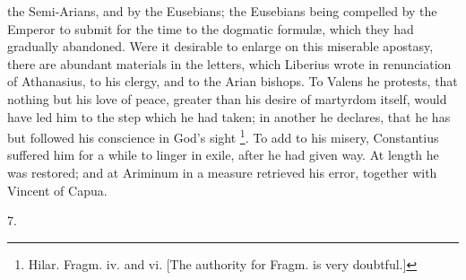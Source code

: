 the Semi-Arians, and by the Eusebians; the Eusebians being compelled
by the Emperor to submit for the time to the dogmatic formulæ, which
they had gradually abandoned. Were it desirable to enlarge on this
miserable apostasy, there are abundant materials in the letters, which
Liberius wrote in renunciation of Athanasius, to his clergy, and to
the Arian bishops. To Valens he protests, that nothing but his
love of peace, greater than his desire of martyrdom itself, would have
led him to the step which he had taken; in another he declares, that
he has but followed his conscience in God's sight \footnote{Hilar. Fragm. iv. and vi. [The authority for
Fragm. is very doubtful.]}. To add to his misery, Constantius suffered him for a while to
linger in exile, after he had given way. At length he was restored;
and at Ariminum in a measure retrieved his error, together with
Vincent of Capua.

7.

